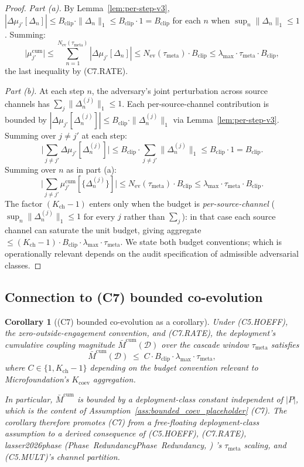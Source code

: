 \documentclass{article}
\makeatletter
\newcommand{\citep}[2][]{%
  \begingroup
  \def\@tmpkey{#2}%
  \ifx\@tmpkey\@empty\else
    (\ifx\@empty#1\@empty\else #1, \fi
     \@nameuse{bibkey@\@tmpkey})%
  \fi
  \endgroup
}
\newtheorem{corollary}{Corollary}
\newcommand{\Bclip}{B_{\mathrm{clip}}}
\newcommand{\Kch}{K_{\mathrm{ch}}}
\newcommand{\Nev}{N_{\mathrm{ev}}}
\newcommand{\lammax}{\lambda_{\max}}
\newcommand{\taumeta}{\tau_{\mathrm{meta}}}
\makeatother
\begin{document}
\begin{proof}
\emph{Part (a).}  By Lemma~\ref{lem:per-step-v3}, $|\Delta\mu_{j'}[
\Delta_n]| \leq \Bclip \cdot \|\Delta_n\|_1 \leq \Bclip \cdot 1 =
\Bclip$ for each $n$ when $\sup_n \|\Delta_n\|_1 \leq 1$.  Summing:
\[
  \big| \mu_{j'}^{\mathrm{cum}} \big| \leq \sum_{n=1}^{\Nev(\taumeta)}
  |\Delta\mu_{j'}[\Delta_n]| \leq \Nev(\taumeta) \cdot \Bclip
  \leq \lammax \cdot \taumeta \cdot \Bclip,
\]
the last inequality by (C7.RATE).

\emph{Part (b).}  At each step $n$, the adversary's joint
perturbation across source channels has $\sum_j
\|\Delta_n^{(j)}\|_1 \leq 1$.  Each per-source-channel contribution
is bounded by $|\Delta\mu_{j'}[\Delta_n^{(j)}]| \leq \Bclip \cdot
\|\Delta_n^{(j)}\|_1$ via Lemma~\ref{lem:per-step-v3}.  Summing
over $j \neq j'$ at each step:
\[
  \big| \sum_{j \neq j'} \Delta\mu_{j'}[\Delta_n^{(j)}] \big|
  \leq \Bclip \cdot \sum_{j \neq j'} \|\Delta_n^{(j)}\|_1
  \leq \Bclip \cdot 1 = \Bclip.
\]
Summing over $n$ as in part (a):
\[
  \big| \sum_{j \neq j'} \mu_{j'}^{\mathrm{cum}}[\{\Delta_n^{(j)}\}] \big|
  \leq \Nev(\taumeta) \cdot \Bclip \leq \lammax \cdot \taumeta \cdot
  \Bclip.
\]
The factor $(\Kch - 1)$ enters only when the budget is
\emph{per-source-channel} ($\sup_n \|\Delta_n^{(j)}\|_1 \leq 1$ for
every $j$ rather than $\sum_j$): in that case each source channel
can saturate the unit budget, giving aggregate $\leq (\Kch - 1)
\cdot \Bclip \cdot \lammax \cdot \taumeta$.  We state both
budget conventions; which is operationally relevant depends on
the audit specification of admissible adversarial classes.
\end{proof}

\subsection{Connection to (C7) bounded co-evolution}

\begin{corollary}[(C7) bounded co-evolution as a corollary]
\label{cor:c7-corollary-v3}
Under (C5.HOEFF), the zero-outside-engagement convention, and
(C7.RATE), the deployment's cumulative coupling magnitude
$\bar{M}^{\mathrm{cum}}(\mathcal{D})$ over the cascade window
$\taumeta$ satisfies
\begin{equation}
  \bar{M}^{\mathrm{cum}}(\mathcal{D}) \;\leq\; C \cdot \Bclip \cdot
  \lammax \cdot \taumeta,
\end{equation}
where $C \in \{1, \Kch - 1\}$ depending on the budget convention
relevant to Microfoundation's $K_{\mathrm{coev}}$ aggregation.

In particular, $\bar{M}^{\mathrm{cum}}$ is bounded by a
deployment-class constant independent of $|P|$, which is the
content of Assumption~\ref{ass:bounded_coev_placeholder} (C7).
The corollary therefore promotes (C7) from a free-floating
deployment-class assumption to a derived consequence of
(C5.HOEFF), (C7.RATE), \citep[Phase~Redundancy]{lasser2026phase}'s
$\taumeta$ scaling, and (C5.MULT)'s channel partition.
\end{corollary}
\end{document}
